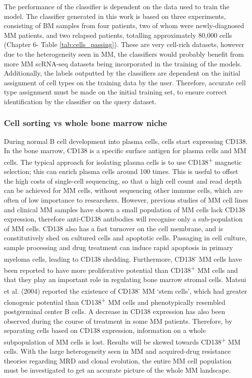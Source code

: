 The performance of the classifier is dependent on the data used to train the model.
The classifier generated in this work is based on three experiments, consisting of BM samples from four patients, two of whom were newly-diagnosed MM patients, and two relapsed patients, totalling approximately 80,000 cells (Chapter 6- Table \ref{tab:cells_passing}).
These are very cell-rich datasets, however due to the heterogeneity seen in MM, the classifiers would probably benefit from more MM scRNA-seq datasets being incorporated in the training of the models.
Additionally, the labels outputted by the classifiers are dependent on the initial assignment of cell types on the training data by the user.
Therefore, accurate cell type assignment must be made on the initial training set, to ensure correct identification by the classifier on the query dataset.

\subsubsection{Cell sorting vs whole bone marrow niche}
During normal B cell development into plasma cells, cells start expressing CD138.
In the bone marrow, CD138 is a specific surface antigen for plasma cells and MM cells\cite{kawano2012multiple}.
The typical approach for isolating plasma cells is to use CD138\textsuperscript{+} magnetic selection;
this can enrich plasma cells around 100 times\cite{bansal2021impact}.
This is useful to offset the high costs of single-cell sequencing, so that a high cell count and read depth can be achieved for MM cells, without sequencing other immune cells, which are often of low importance to researchers.
However, previous studies of MM cell lines and clinical MM samples have shown a small population of MM cells lack CD138 expression\cite{matsui2004characterization}, therefore anti-CD138 antibodies will recognise only a sub-population of MM cells.
CD138 also has a fast turnover on the cell membrane, and is constitutively shed on cultured cells and apoptotic cells\cite{bansal2021impact}.
Passaging in cell culture, sample processing and drug treatment can induce rapid apoptosis in primary myeloma cells, leading to CD138 shedding.
Furthermore, CD138\textsuperscript{-} MM cells have been reported to have more proliferative potential than CD138\textsuperscript{+} MM cells and that they play an important role in regulating bone marrow stromal cells\cite{reid2010characterisation, wu2015cd138}.
Matsui et al. (2004) reported the existence of CD138\textsuperscript{-} MM `stem cells', which had greater clonogenic potential than CD138\textsuperscript{+} MM cells and phenotypically resembled postgerminal center B cells\cite{matsui2004characterization}.
A decrease in CD138 expression has also been observed during the course of treatment in some MM patients\cite{kawano2012multiple}.
Therefore, by separating cells based on CD138 expression, information on a whole subpopulation of MM cells is lost.
Results will be skewed towards CD138\textsuperscript{+} MM cells.
With the large heterogeneity seen in MM and acquired-drug resistance theories regarding MRD and clonal evolution, the entire MM cell population must be investigated to get an accurate picture of the whole MM landscape.

